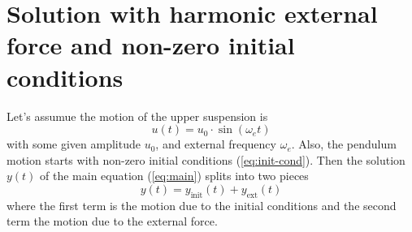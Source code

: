 \documentclass[paper=A4, pagesize, 12pt]{article}
\begin{document}
\section{Solution with harmonic external force and non-zero initial conditions}
Let's assumue the motion of the upper suspension is
\[
u(t) = u_0 \cdot \sin(\omega_e t)
\]
with some given amplitude $u_0$, and external
frequency $\omega_e$.
Also, the pendulum motion starts with non-zero initial conditions
(\ref{eq:init-cond}). Then the solution $y(t)$ of the main equation
(\ref{eq:main}) splits into two pieces
\[
y(t) = y_{\text{init}}(t) + y_{\text{ext}}(t)
\]
where the first term is the motion due to the initial conditions and the second
term the motion due to the external force.
\end{document}
